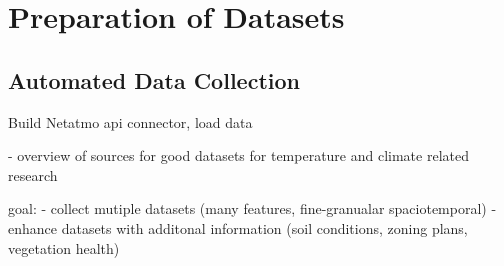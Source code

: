 \chapter{Preparation of Datasets}
\label{chap:preparations data sets}

\section{Automated Data Collection}

Build Netatmo api connector, load data


- overview of sources for good datasets for temperature and climate related research

goal:
- collect mutiple datasets (many features, fine-granualar spaciotemporal)
- enhance datasets with additonal information (soil conditions, zoning plans, vegetation health)
